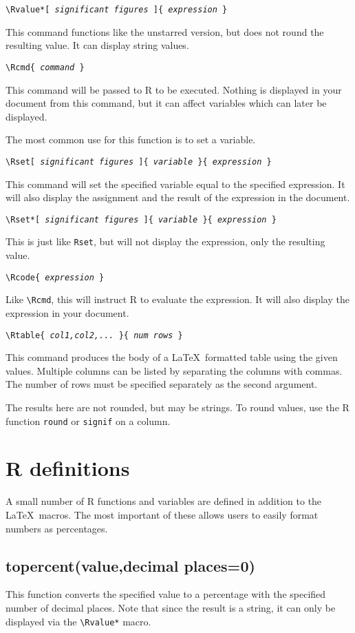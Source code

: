 \documentclass{article}
\newcommand{\DescribeMacro}[2]{\par\noindent\texttt{#1}\par\noindent#2}
\newcommand{\oarg}[1]{[ \emph{#1} ]}
\newcommand{\marg}[1]{\{ \emph{#1} \}}
\begin{document}
\DescribeMacro{\textbackslash{}Rvalue*\oarg{significant figures}\marg{expression}}
This command functions like the unstarred version, but does not round the resulting value.  It can display string values.

\DescribeMacro{\textbackslash{}Rcmd\marg{command}}
This command will be passed to R to be executed.  Nothing is displayed in your document from this command, but it can affect variables which can later be displayed.

The most common use for this function is to set a variable.

\DescribeMacro{\textbackslash{}Rset\oarg{significant figures}\marg{variable}\marg{expression}}
This command will set the specified variable equal to the specified expression.  It will also display the assignment and the result of the expression in the document.

\DescribeMacro{\textbackslash{}Rset*\oarg{significant figures}\marg{variable}\marg{expression}}
This is just like \texttt{Rset}, but will not display the expression, only the resulting value.

\DescribeMacro{\textbackslash{}Rcode\marg{expression}}
Like \texttt{\textbackslash{}Rcmd}, this will instruct R to evaluate the expression.  It will also display the expression in your document.

\DescribeMacro{\textbackslash{}Rtable\marg{col1,col2,...}\marg{num rows}}
This command produces the body of a \LaTeX\ formatted table using the given values.  Multiple columns can be listed by separating the columns with commas.  The number of rows must be specified separately as the second argument.

The results here are not rounded, but may be strings.  To round values, use the R function \texttt{round} or \texttt{signif} on a column.

\section{R definitions}
A small number of R functions and variables are defined in addition to the \LaTeX\ macros.  The most important of these allows users to easily format numbers as percentages.
\subsection{topercent(value,decimal places=0)}
This function converts the specified value to a percentage with the specified number of decimal places.  Note that since the result is a string, it can only be displayed via the \verb|\Rvalue*| macro.
\end{document}
